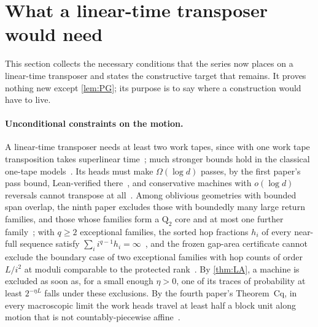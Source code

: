 \section{What a linear-time transposer would need}\label{sec:construction}

This section collects the necessary conditions that the series now places on a linear-time transposer and states the
constructive target that remains. It proves nothing new except \cref{lem:PG}; its purpose is to say where a
construction would have to live.

\paragraph{Unconditional constraints on the motion.} A linear-time transposer needs at least two work tapes, since with
one work tape transposition takes superlinear time~\cite[Corollary~3.18(c)]{FourthPaper2026}; much stronger bounds hold
in the classical one-tape models~\cite{DMS1991,DietzfelbingerMaass1993}. Its heads must make
$\Omega(\log d)$ passes, by the first paper's pass bound, Lean-verified there~\cite[Theorems~5.9 and~5.12]{FirstPaper2026},
and conservative machines with $o(\log d)$ reversals cannot transpose at all~\cite{Kirchherr1988}. Among oblivious
geometries with bounded span overlap, the ninth paper excludes those with boundedly many large return families, and
those whose families form a $\mathrm Q_2$ core and at most one further family~\cite[Corollaries~4.3 and~4.5]{SourceCovers2026};
with $q\ge2$ exceptional families, the sorted hop fractions $h_i$ of every near-full sequence satisfy
$\sum_ii^{q-1}h_i=\infty$~\cite[Theorem~4.2]{SourceCovers2026}, and the frozen gap-area certificate cannot exclude the
boundary case of two exceptional families with hop counts of order $L/i^2$ at moduli comparable to the protected
rank~\cite{GapAreaMemo2026}. By \cref{thm:LA}, a machine is
excluded as soon as, for a small enough $\eta>0$, one of its traces of probability at least $2^{-\eta L}$ falls under
these exclusions. By the fourth paper's Theorem~Cq, in every macroscopic limit the work heads travel at least half a
block unit along motion that is not countably-piecewise affine~\cite[Theorem~3.12]{FourthPaper2026}.

